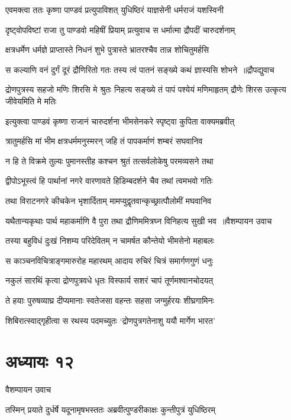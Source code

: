 \twolineshloka
{एवमक्त्वा ततः कृष्णा पाण्डवं प्रत्युपाविशत्}
{युधिष्ठिरं याज्ञसेनी धर्मराजं यशस्विनी}


\twolineshloka
{दृष्ट्वोपविष्टां राजा तु पाण्डवो महिषीं प्रियाम्}
{प्रत्युवाच स धर्मात्मा द्रौपदीं चारुदर्शनाम्}


\twolineshloka
{क्षत्रधर्मेण धर्मज्ञे प्राप्तास्ते निधनं शुभे}
{पुत्रास्ते भ्रातरश्चैव तान्न शोचितुमर्हसि}


\threelineshloka
{स कल्याणि वनं दुर्गं दूरं द्रौणिरितो गतः}
{तस्य त्वं पातनं सङ्ख्ये कथं ज्ञास्यसि शोभने ॥द्रौपद्युवाच}
{}


\threelineshloka
{द्रोणपुत्रस्य सहजो मणिः शिरसि मे श्रुतः}
{निहत्य सङ्ख्ये तं पापं पश्येयं मणिमाहृतम्}
{द्रौणेः शिरस उत्कृत्य जीवेयमिति मे मतिः}


\twolineshloka
{इत्युक्त्वा पाण्डवं कृष्णा राजानं चारुदर्शना}
{भीमसेनकरे स्पृष्ट्वा कुपिता वाक्यमब्रवीत्}


\twolineshloka
{त्रातुमर्हसि मां भीम क्षत्रधर्ममनुस्मरन्}
{जहि तं पापकर्माणं शम्बरं सघवानिव}


\twolineshloka
{न हि ते विक्रमे तुल्यः पुमानस्तीह कश्चन}
{श्रुतं तत्सर्वलोकेषु परमव्यसने तथा}


\twolineshloka
{द्वीपोऽभूस्त्वं हि पार्थानां नगरे वारणावते}
{हिडिम्बदर्शने चैव तथां त्वमभवो गतिः}


\twolineshloka
{तथा विराटनगरे कीचकेन भृशार्दिताम्}
{मामप्युद्वृतवान्कृच्छ्रात्पौलोमीं मघवानिव}


\threelineshloka
{यथैतान्यकृथाः पार्थ महाकर्माणि वै पुरा}
{तथा द्रौणिममित्रघ्न विनिहत्य सुखी भव ॥वैशम्पायन उवाच}
{}


\twolineshloka
{तस्या बहुविधं दुःखं निशम्य परिदेवितम्}
{न चामर्षत कौन्तेयो भीमसेनो महाबलः}


\twolineshloka
{स काञ्चनविचित्राङ्गमारुरोह महारथम्}
{आदाय रुचिरं चित्रं समार्गणगुणं धनुः}


\twolineshloka
{नकुलं सारथिं कृत्वा द्रोणपुत्रवधे धृतः}
{विस्फार्य सशरं चापं तूर्णमश्वानचोदयत्}


\twolineshloka
{ते हयाः पुरुषव्याघ्र दीप्यमानाः स्वतेजसा}
{वहन्तः सहसा जग्मुर्हरयः शीघ्रगामिनः}


\twolineshloka
{शिबिरात्स्वाद्गृहीत्वा स रथस्य पदमच्युतः}
{`द्रोणपुत्रगतेनाशु ययौ मार्गेण भारत'}


\chapter{अध्यायः १२}
\twolineshloka
{वैशम्पायन उवाच}
{}


\twolineshloka
{तस्मिन् प्रयाते दुर्धर्षे यदूनामृषभस्ततः}
{अब्रवीत्पुण्डरीकाक्षः कुन्तीपुत्रं युधिष्ठिरम्}


